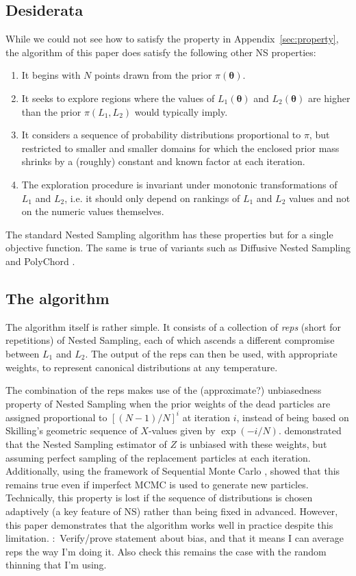 \documentclass[entropy,article,submit,moreauthors,pdftex,10pt,a4paper]{Definitions/mdpi}
\newcommand{\xx}{\boldsymbol{\theta}}
\newcommand{\todo}{\color{blue}{\bf TODO}:~}
\begin{document}
\subsection{Desiderata}
While we could not see how to satisfy the property in
Appendix~\ref{sec:property},
the algorithm of this paper does satisfy the following other NS properties:
\begin{enumerate}
\item It begins with $N$ points drawn from the prior $\pi(\xx)$.
\item It seeks to explore regions where the values of
$L_1(\xx)$ and $L_2(\xx)$ are higher than the prior $\pi(L_1, L_2)$
would typically imply.
\item It considers a sequence of probability
distributions proportional to $\pi$, but restricted to smaller and smaller
domains for which the enclosed prior mass shrinks by a (roughly) constant and
known factor at each iteration.
\item The exploration procedure is invariant under monotonic transformations of
$L_1$ and $L_2$, i.e. it should only depend on rankings of $L_1$ and $L_2$
values and not on the numeric values themselves.
\end{enumerate}
The standard Nested Sampling algorithm has these properties but for a
single objective function. The same is true of variants such as
Diffusive Nested Sampling \citep{dns, dnest4} and PolyChord
\citep{handley2015polychord}.

\subsection{The algorithm}
The algorithm itself is rather simple. It consists of a collection of
{\em reps} (short for repetitions) of Nested Sampling, each of which ascends
a different compromise between $L_1$ and $L_2$. The output of the reps can then
be used, with appropriate weights, to represent canonical distributions at
any temperature.

The combination of the reps makes use of the (approximate?) unbiasedness
property of Nested Sampling when the prior weights of the dead particles are
assigned proportional to
$[(N-1)/N]^i$ at iteration $i$, instead of being based on
Skilling's geometric sequence of $X$-values given by $\exp(-i/N)$.
\citet{walter2017point} demonstrated that the Nested Sampling estimator of $Z$
is unbiased with these weights, but assuming perfect sampling of the replacement
particles at each iteration. Additionally, using the framework of
Sequential Monte Carlo \citep{doucet2001introduction},
\citet{salomone2018unbiased} showed that this remains true even if imperfect
MCMC is used to generate new particles. Technically, this property is
lost if the sequence of distributions is chosen adaptively (a key feature of NS)
rather than being fixed in advanced. However, this paper demonstrates that the
algorithm works well in practice despite this limitation.
{\todo Verify/prove statement about bias, and that it means I can average
reps the way I'm doing it. Also check this remains the case with the random
thinning that I'm using.}
\end{document}

